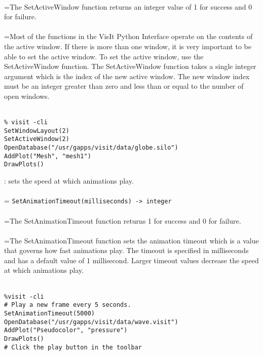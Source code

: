 \documentclass[10pt,a4paper]{report}
\begin{document}
 \\ 
\hangindent=\parindent The SetActiveWindow function returns an integer value of 1 for success and 0 for failure. \\[-3mm] 

 \\ 
\hangindent=\parindent Most of the functions in the VisIt Python Interface operate on the contents of the active window. If there is more than one window, it is very important to be able to set the active window. To set the active window, use the SetActiveWindow function. The SetActiveWindow function takes a single integer argument which is the index of the new active window. The new window index must be an integer greater than zero and less than or equal to the number of open windows. \\[-3mm] 

\\[-6mm]
\begin{verbatim}% visit -cli
SetWindowLayout(2)
SetActiveWindow(2)
OpenDatabase("/usr/gapps/visit/data/globe.silo")
AddPlot("Mesh", "mesh1")
DrawPlots()
\end{verbatim}
\newpage


{}
: sets the speed at which animations play.\\[-3mm]

 \\ 
\hangindent=\parindent 
\verb!SetAnimationTimeout(milliseconds) -> integer!\\ [-3mm]

 \\ 
\hangindent=\parindent The SetAnimationTimeout function returns 1 for success and 0 for failure. \\[-3mm] 

 \\ 
\hangindent=\parindent The SetAnimationTimeout function sets the animation timeout which is a value that governs how fast animations play. The timeout is specified in milliseconds and has a default value of 1 millisecond. Larger timeout values decrease the speed at which animations play. \\[-3mm] 

\\[-6mm]
\begin{verbatim}%visit -cli
# Play a new frame every 5 seconds.
SetAnimationTimeout(5000)
OpenDatabase("/usr/gapps/visit/data/wave.visit")
AddPlot("Pseudocolor", "pressure")
DrawPlots()
# Click the play button in the toolbar
\end{verbatim}
\newpage
\end{document}

